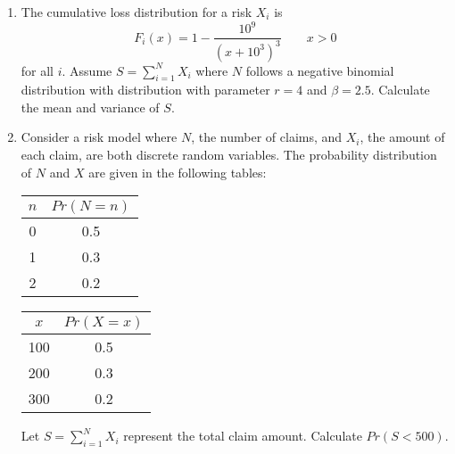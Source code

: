 \documentclass{article}
\begin{document}
\begin{enumerate}
\item 
	The cumulative loss distribution for a risk $X_i$ is 
	\[F_i(x) = 1 - \frac{10^9}{(x+10^3)^3} \qquad x > 0\]
for all $i$.   Assume $S = \sum_{i=1}^N X_i$ where $N$ follows a negative binomial distribution with  distribution with parameter $r = 4$ and $\beta = 2.5$. Calculate the mean and variance of $S$. 

\item 
  Consider a risk model where $N$, the number of claims, and $X_i$, the amount of each claim, are both discrete random variables. The probability distribution of $N$ and $X$ are given in the following tables:

  \begin{table}[h]
  \centering
  \begin{minipage}{.5\linewidth}
  \centering
  \begin{tabular}{cc}
  \hline
  $n$ & ${Pr}(N=n)$ \\ \hline
  0 & 0.5 \\
  1 & 0.3 \\
  2 & 0.2 \\ \hline
  \end{tabular}
  \end{minipage}%
  \begin{minipage}{.5\linewidth}
  \centering
 
  \begin{tabular}{cc}
  \hline
  $x$ & ${Pr}(X=x)$ \\ \hline
  100 & 0.5 \\
  200 & 0.3 \\ 
  300 & 0.2 \\ \hline
  \end{tabular}
  \end{minipage}
  \end{table}

  Let $S = \sum_{i=1}^{N} X_i$ represent the total claim amount. Calculate ${Pr}(S < 500)$.




\end{enumerate}
\end{document}
